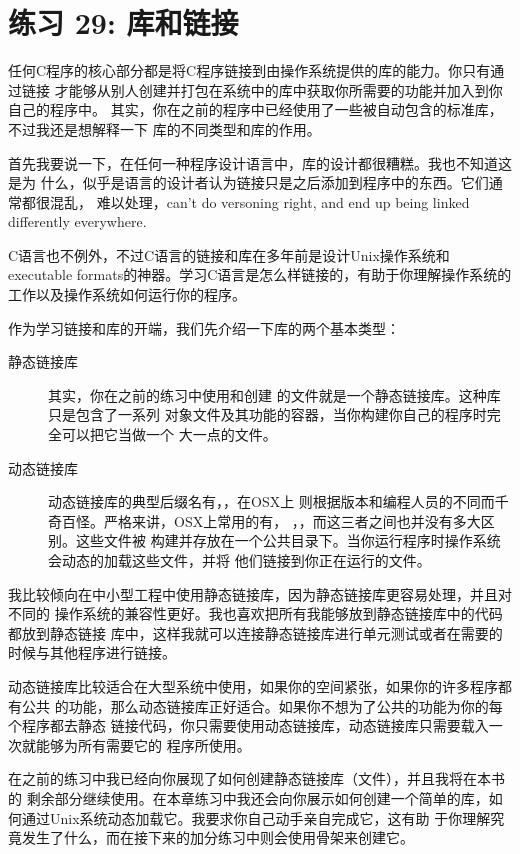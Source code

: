 \chapter{练习 29: 库和链接}

任何C程序的核心部分都是将C程序链接到由操作系统提供的库的能力。你只有通过链接
才能够从别人创建并打包在系统中的库中获取你所需要的功能并加入到你自己的程序中。
其实，你在之前的程序中已经使用了一些被自动包含的标准库，不过我还是想解释一下
库的不同类型和库的作用。

首先我要说一下，在任何一种程序设计语言中，库的设计都很糟糕。我也不知道这是为
什么，似乎是语言的设计者认为链接只是之后添加到程序中的东西。它们通常都很混乱，
难以处理，can't do versoning right, and end up being linked differently everywhere.

C语言也不例外，不过C语言的链接和库在多年前是设计Unix操作系统和executable
formats的神器。学习C语言是怎么样链接的，有助于你理解操作系统的工作以及操作系统如何运行你的程序。

作为学习链接和库的开端，我们先介绍一下库的两个基本类型：

\begin{description}
\item[静态链接库] 其实，你在之前的练习中使用和创建
    的文件就是一个静态链接库。这种库只是包含了一系列
    对象文件及其功能的容器，当你构建你自己的程序时完全可以把它当做一个
    大一点的文件。
\item[动态链接库] 动态链接库的典型后缀名有，，在OSX上
    则根据版本和编程人员的不同而千奇百怪。严格来讲，OSX上常用的有，
    ，，而这三者之间也并没有多大区别。这些文件被
    构建并存放在一个公共目录下。当你运行程序时操作系统会动态的加载这些文件，并将
    他们链接到你正在运行的文件。
\end{description}

我比较倾向在中小型工程中使用静态链接库，因为静态链接库更容易处理，并且对不同的
操作系统的兼容性更好。我也喜欢把所有我能够放到静态链接库中的代码都放到静态链接
库中，这样我就可以连接静态链接库进行单元测试或者在需要的时候与其他程序进行链接。

动态链接库比较适合在大型系统中使用，如果你的空间紧张，如果你的许多程序都有公共
的功能，那么动态链接库正好适合。如果你不想为了公共的功能为你的每个程序都去静态
链接代码，你只需要使用动态链接库，动态链接库只需要载入一次就能够为所有需要它的
程序所使用。

在之前的练习中我已经向你展现了如何创建静态链接库（文件），并且我将在本书的
剩余部分继续使用。在本章练习中我还会向你展示如何创建一个简单的库，如
何通过Unix系统动态加载它。我要求你自己动手亲自完成它，这有助
于你理解究竟发生了什么，而在接下来的加分练习中则会使用骨架来创建它。

